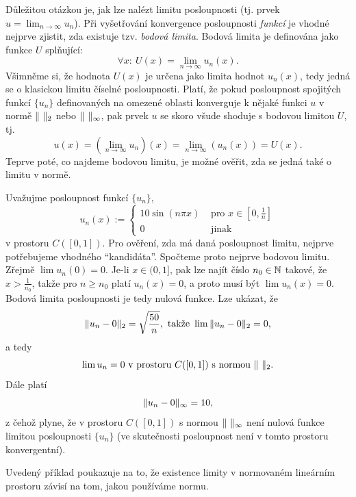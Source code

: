 Důležitou otázkou je, jak lze nalézt limitu posloupnosti (tj. prvek $u=\lim_{n\to\infty} u_n$).
Při vyšetřování konvergence posloupnosti \emph{funkcí} je vhodné nejprve zjistit, zda existuje tzv. \emph{bodová limita}.
Bodová limita je definována jako funkce $U$ splňující:
\[ \forall x: ~U(x) = \lim_{n\to\infty}u_n(x). \]
Všimněme si, že hodnota $U(x)$ je určena jako limita hodnot $u_n(x)$, tedy jedná se o klasickou limitu číselné posloupnosti.
Platí, že pokud posloupnost spojitých funkcí $\{u_n\}$ definovaných na omezené oblasti konverguje k nějaké funkci $u$ v normě $\|\ \|_2$ nebo $\|\ \|_\infty$, pak prvek $u$ se skoro všude shoduje s bodovou limitou $U$, tj.
\[ u(x) = (\lim_{n\to\infty} u_n)(x) = \lim_{n\to\infty} (u_n(x)) = U(x). \]
Teprve poté, co najdeme bodovou limitu, je možné ověřit, zda se jedná také o limitu v normě.


\begin{ex}
\label{ex:conv_l2_linf}
Uvažujme posloupnost funkcí $\{u_n\}$,
\[ u_n(x) := \begin{cases}10\sin(n\pi x) & \mbox{ pro }x\in[0,\frac1n]\\0 & \mbox{ jinak}\end{cases} \]
v prostoru $C([0,1])$.
Pro ověření, zda má daná posloupnost limitu, nejprve potřebujeme vhodného ``kandidáta''.
Spočteme proto nejprve bodovou limitu.
Zřejmě $\lim u_n(0)=0$.
Je-li $x\in(0,1]$, pak lze najít číslo $n_0\in\mathbb N$ takové, že $x>\frac1{n_0}$, takže pro $n\ge n_0$ platí $u_n(x)=0$, a proto musí být $\lim u_n(x) = 0$.
Bodová limita posloupnosti je tedy nulová funkce.
Lze ukázat, že
\[ \|u_n-0\|_2 = \sqrt{\frac{50}n}, \mbox{ takže }\lim \|u_n-0\|_2=0, \]
a tedy
\[ \lim u_n = 0 \mbox{ v prostoru }C([0,1]) \mbox{ s normou }\|\ \|_2. \]
Dále platí
\[ \|u_n-0\|_\infty = 10, \]
z čehož plyne, že v prostoru $C([0,1])$ s normou $\|\ \|_\infty$ není nulová funkce limitou posloupnosti $\{u_n\}$ (ve skutečnosti posloupnost není v tomto prostoru konvergentní).
\end{ex}
% 
Uvedený příklad poukazuje na to, že existence limity v normovaném lineárním prostoru závisí na tom, jakou používáme normu.



